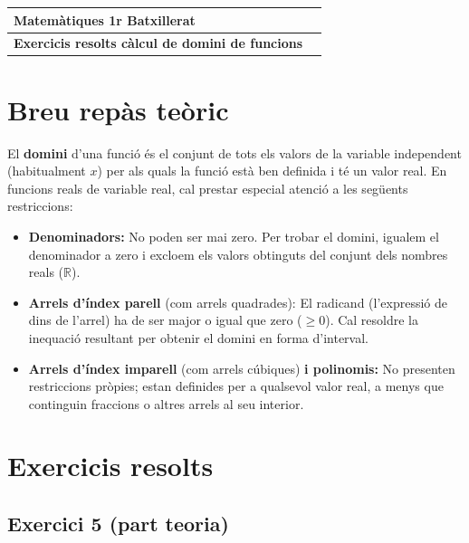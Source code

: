 \documentclass[12pt,a4paper]{article}
\begin{document}
\begingroup
\renewcommand{\arraystretch}{2.2}
\begin{tabularx}{\textwidth}{|X|p{4cm}|}
\hline
\textbf{Matemàtiques 1r Batxillerat} \\ \hline
\textbf{Exercicis resolts càlcul de domini de funcions}  \\ \hline
\end{tabularx}
\endgroup

\vspace{0.5cm}


\renewcommand{\contentsname}{Índex}
\tableofcontents
\vspace{1cm}


\section{Breu repàs teòric}
El \textbf{domini} d'una funció és el conjunt de tots els valors de la variable independent (habitualment $x$) per als quals la funció està ben definida i té un valor real. En funcions reals de variable real, cal prestar especial atenció a les següents restriccions:
\begin{itemize}
    \item \textbf{Denominadors:} No poden ser mai zero. Per trobar el domini, igualem el denominador a zero i excloem els valors obtinguts del conjunt dels nombres reals ($\mathbb{R}$).
    \item \textbf{Arrels d'índex parell} (com arrels quadrades): El radicand (l'expressió de dins de l'arrel) ha de ser major o igual que zero ($\ge 0$). Cal resoldre la inequació resultant per obtenir el domini en forma d'interval.
    \item \textbf{Arrels d'índex imparell} (com arrels cúbiques) \textbf{i polinomis:} No presenten restriccions pròpies; estan definides per a qualsevol valor real, a menys que continguin fraccions o altres arrels al seu interior.
\end{itemize}

\vspace{0.5cm}

\section{Exercicis resolts}
\subsection{Exercici 5 (part teoria)}
\end{document}
